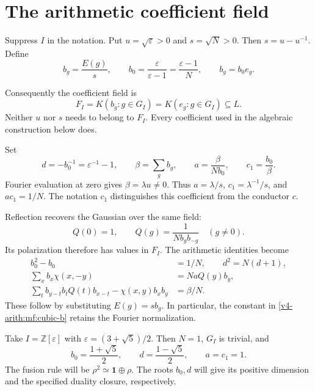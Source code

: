 \section{The arithmetic coefficient field}
\label{v4-arith:mf:coefficients}

Suppress \(I\) in the notation. Put
\(u=\sqrt\varepsilon>0\) and \(s=\sqrt N>0\).
Then \(s=u-u^{-1}\). Define
\begin{equation}\label{v4-arith:mf:b}
 b_g=\frac{E(g)}s,\qquad
 b_0=\frac{\varepsilon}{\varepsilon-1}
      =\frac{\varepsilon-1}{N},\qquad b_g=b_0e_g.
\end{equation}

Consequently the coefficient field is
\[
 F_I=K(b_g:g\in G_I)=K(e_g:g\in G_I)\subseteq L.
\]
Neither \(u\) nor \(s\) needs to belong to \(F_I\).
Every coefficient used in the algebraic construction below does.

Set
\begin{equation}\label{v4-arith:mf:parameters}
 d=-b_0^{-1}=\varepsilon^{-1}-1,\qquad
 \beta=\sum_gb_g,\qquad
 a=\frac{\beta}{Nb_0},\qquad c_1=\frac{b_0}{\beta}.
\end{equation}
Fourier evaluation at zero gives \(\beta=\lambda u\ne0\).
Thus \(a=\lambda/s\), \(c_1=\lambda^{-1}/s\), and
\(ac_1=1/N\). The notation \(c_1\) distinguishes this coefficient
from the conductor \(c\).

Reflection recovers the Gaussian over the same field:
\[
 Q(0)=1,\qquad
 Q(g)=\frac1{Nb_gb_{-g}}\quad(g\ne0).
\]
Its polarization therefore has values in \(F_I\).
The arithmetic identities become
\begin{align}
 b_0^2-b_0&=1/N,\qquad d^2=N(d+1),\label{v4-arith:mf:scalar}\\
 \sum_x b_x\chi(x,-y)&=NaQ(y)b_y,\label{v4-arith:mf:fourier-b}\\
 \sum_t b_{y-t}b_tQ(t)b_{x-t}-\chi(x,y)b_xb_y
       &=\beta/N.\label{v4-arith:mf:cubic-b}
\end{align}
These follow by substituting \(E(g)=s b_g\).
In particular, the constant in
\eqref{v4-arith:mf:cubic-b} retains the Fourier normalization.

\begin{example}\label{v4-arith:mf:fibonacci}
Take \(I=\mathbb Z[\varepsilon]\) with
\(\varepsilon=(3+\sqrt5)/2\).
Then \(N=1\), \(G_I\) is trivial, and
\[
 b_0=\frac{1+\sqrt5}{2},\qquad
 d=\frac{1-\sqrt5}{2},\qquad a=c_1=1.
\]
The fusion rule will be \(\rho^2\simeq\mathbf1\oplus\rho\).
The roots \(b_0,d\) will give its positive dimension and the
specified duality closure, respectively.
\end{example}

